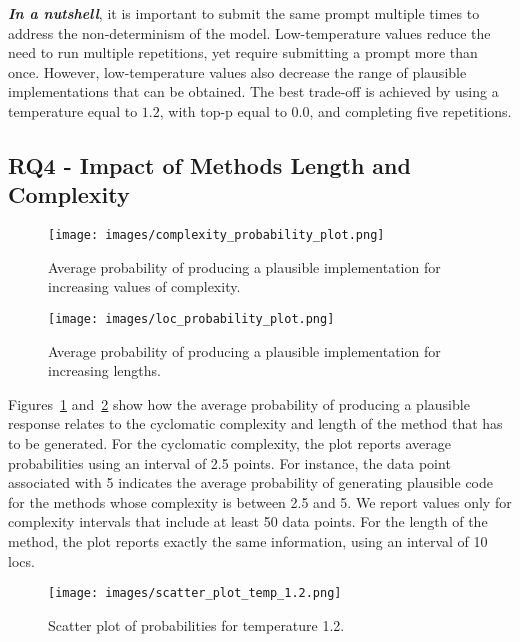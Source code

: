 \textbf{\textit{In a nutshell}}, it is important to submit the same prompt multiple times to address the non-determinism of the model. Low-temperature values reduce the need to run multiple repetitions, yet require submitting a prompt more than once. However, low-temperature values also decrease the range of plausible implementations that can be obtained. The best trade-off is achieved by using a temperature equal to $1.2$, with top-p equal to $0.0$, and completing five repetitions.

\subsection{RQ4 - Impact of Methods Length and Complexity}

\begin{figure}[ht]
        \centering
        \texttt{[image: images/complexity\_probability\_plot.png]}
        \caption{Average probability of producing a plausible implementation for increasing values of complexity.}
        \label{fig:AvgProbPlauvsCC}
\end{figure}

\begin{figure}[ht]
        \centering
        \texttt{[image: images/loc\_probability\_plot.png]}
        \caption{Average probability of producing a plausible implementation for increasing lengths.}
        \label{fig:AvgProbPlauvsLength}
\end{figure}

Figures~\ref{fig:AvgProbPlauvsCC}  and~\ref{fig:AvgProbPlauvsLength}
show how the average probability of producing a plausible response relates to the cyclomatic complexity and length of the method that has to be generated. For the cyclomatic complexity, the plot reports average probabilities using an interval of 2.5 points. For instance, the data point associated with 5 indicates the average probability of generating plausible code for the methods whose complexity is between 2.5 and 5. We report values only for complexity intervals that include at least 50 data points. For the length of the method, the plot reports exactly the same information, using an interval of 10 locs.

\begin{figure}[ht]
        \centering
        \texttt{[image: images/scatter\_plot\_temp\_1.2.png]}
        \caption{Scatter plot of probabilities for temperature 1.2.}
        \label{fig:ScatterProbT1.2}
\end{figure}

